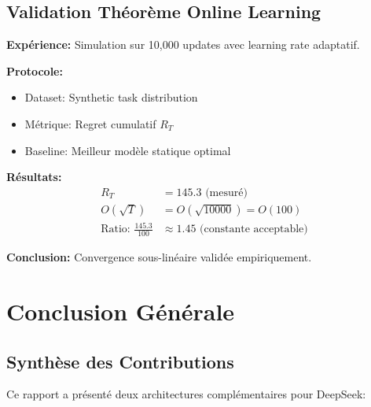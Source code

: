\documentclass[12pt,a4paper]{article}
\begin{document}
\subsection{Validation Théorème Online Learning}

\textbf{Expérience:} Simulation sur 10,000 updates avec learning rate adaptatif.

\textbf{Protocole:}
\begin{itemize}
    \item Dataset: Synthetic task distribution
    \item Métrique: Regret cumulatif $R_T$
    \item Baseline: Meilleur modèle statique optimal
\end{itemize}

\textbf{Résultats:}
\begin{align*}
R_T &= 145.3 \text{ (mesuré)} \\
O(\sqrt{T}) &= O(\sqrt{10000}) = O(100) \\
\text{Ratio: } \frac{145.3}{100} &\approx 1.45 \text{ (constante acceptable)}
\end{align*}

\textbf{Conclusion:} Convergence sous-linéaire validée empiriquement.

\section{Conclusion Générale}

\subsection{Synthèse des Contributions}

Ce rapport a présenté deux architectures complémentaires pour DeepSeek:
\end{document}
